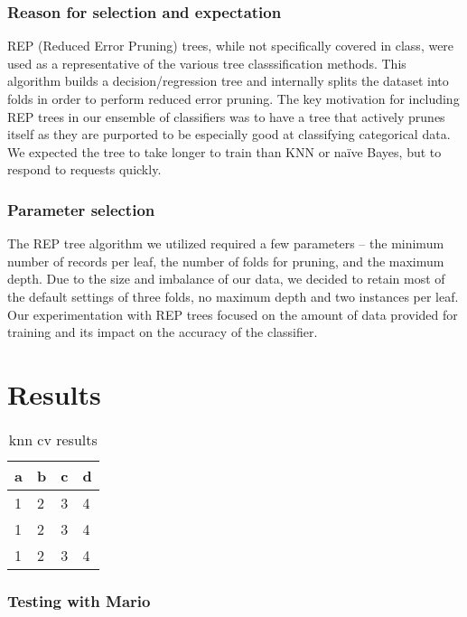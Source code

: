 \documentclass[]{article}   %
\begin{document}
\subsubsection{Reason for selection and expectation}
REP (Reduced Error Pruning) trees, while not specifically covered in class, were used as a representative of the various tree classsification methods. This algorithm builds a decision/regression tree and internally splits the dataset into folds in order to perform reduced error pruning. The key motivation for including REP trees in our ensemble of classifiers was to have a tree that actively prunes itself as they are purported to be especially good at classifying categorical data. We expected the tree to take longer to train than KNN or na\"{i}ve Bayes, but to respond to requests quickly.

\subsubsection{Parameter selection}
The REP tree algorithm we utilized required a few parameters -- the minimum number of records per leaf, the number of folds for pruning, and the maximum depth. Due to the size and imbalance of our data, we decided to retain most of the default settings of three folds, no maximum depth and two instances per leaf. Our experimentation with REP trees focused on the amount of data provided for training and its impact on the accuracy of the classifier.

\section{Results}

\begin{table}[h!]
	\begin{center}
		\caption{knn cv results}
		\begin{tabular}{l | l | l | l }
		a & b & c & d \\
		\hline
		1 & 2 & 3 & 4 \\
		1 & 2 & 3 & 4 \\
		1 & 2 & 3 & 4 \\
		\hline
		\end{tabular}
	\end{center}
\end{table}
\subsubsection{Testing with Mario}
\end{document}
